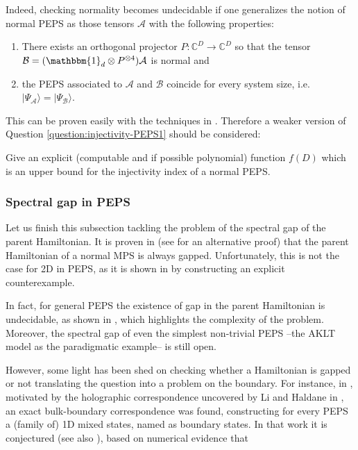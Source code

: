 \documentclass[smallextended]{svjour3}
\renewcommand{\1}{\mathbbm{1}}
\newcommand{\ket} [1] {\vert #1 \rangle}
\begin{document}
Indeed, checking normality becomes undecidable if one generalizes the notion of normal PEPS as those tensors $\mathcal{A}$ with the following properties:
\begin{enumerate}
    \item There exists an orthogonal projector $P:\mathbb{C}^D\to \mathbb{C}^D$ so that the tensor $\mathcal{B}=(\1_d \otimes P^{\otimes 4}) \mathcal{A}$ is normal and
    \item the PEPS associated to $\mathcal{A}$ and $\mathcal{B}$ coincide for every system size, i.e. $\ket{\Psi_{\mathcal{A}}}= \ket{\Psi_{\mathcal{B}}}$.
\end{enumerate}
This can be proven easily with the techniques in \cite{uncomputable-PEPS}. Therefore a weaker version of  Question \ref{question:injectivity-PEPS1} should be considered:

\begin{question} \label{question:injectivity-PEPS2}
    Give an explicit (computable and if possible polynomial) function $f(D)$ which is an upper bound for the injectivity index of a normal PEPS.
\end{question}


\subsubsection{Spectral gap in PEPS} \label{sec:spectral-gap}

Let us finish this subsection tackling the problem of the spectral gap of the parent Hamiltonian. It is proven in \cite{Fannes92} (see \cite{Katroyano-boundary} for an alternative proof) that the parent Hamiltonian of a normal MPS is always gapped.  Unfortunately, this is not the case for 2D in PEPS, as it is shown in \cite{Ising-PEPS} by constructing an explicit counterexample.

In fact, for general PEPS the existence of gap in the parent Hamiltonian is undecidable, as shown in \cite{uncomputable-PEPS}, which highlights the complexity of the problem.  Moreover, the spectral gap of even the simplest non-trivial PEPS --the AKLT model \cite{AKLT} as the paradigmatic example-- is still open.

However, some light has been shed on checking whether a Hamiltonian is gapped or not translating the question into a problem on the boundary. For instance, in \cite{Didier}, motivated by the holographic correspondence uncovered by Li and Haldane in \cite{LiHaldane}, an exact bulk-boundary correspondence was found, constructing for every PEPS a (family of) 1D mixed states, named as boundary states. In that work it is conjectured (see also \cite{Katroyano-boundary}), based on numerical evidence that
\end{document}
